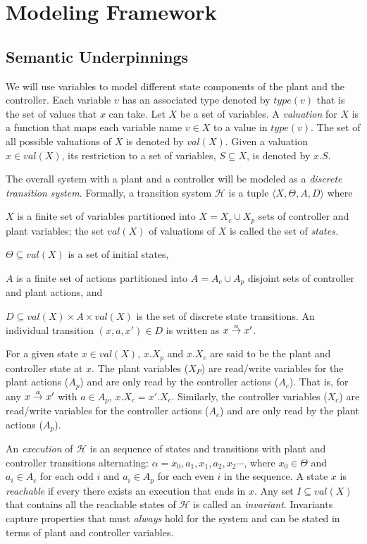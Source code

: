 \newcommand{\dst}{\mathcal{H}}

\section{\mfname Modeling Framework}
\subsection{Semantic Underpinnings}
We will use variables to model different state components of the plant and the controller. Each variable $v$ has an associated type denoted by $type(v)$ that is the set of values that $x$ can take.
Let $X$ be a set of variables. 
%
A {\em valuation\/} for $X$ is a function that maps each variable name $v \in X$ to a value in $type(v)$. The set of all possible valuations of $X$ is denoted by $val(X)$. 
Given a valuation  $x \in val(X)$, its restriction to a set of variables, $S \subseteq X$, is denoted by $x.S$. 

The overall system with a plant and a controller will be modeled as a \emph{discrete transition system\/}.
Formally, a transition system $\dst$  is a tuple $\langle X, \Theta, A, D \rangle$ where 
\begin{enumerate*}[label=(\roman*)]
	\item $X$ is a finite set of variables partitioned into $X= X_c \cup X_p$ sets of controller and plant variables; the set $val(X)$ of valuations of $X$ is called the set of {\em states.} 
    \item $\Theta \subseteq val(X)$ is a set of initial states, 
    \item $A$ is a finite set of actions partitioned into $A = A_c \cup A_p$ disjoint sets of controller and plant actions, and
    \item $D \subseteq val(X) \times A \times val(X)$ is the set of discrete state transitions. An individual transition  $(x, a, x') \in D$ is written as $x \mathrel{\stackrel{a}{\rightarrow}} x'$.
\end{enumerate*}
For a given state $x \in val(X)$, $x.X_p$ and $x.X_c$ are said to be the  plant and controller state at $x$.  
%
The plant variables ($X_P$) are read/write variables for the plant actions ($A_p$) and are only read by the controller actions ($A_c$).
That is, for any $x\mathrel{\stackrel{a}{\rightarrow}}x'$ with $a \in A_p$, $x.X_c = x'.X_c$.  
%
Similarly, the controller variables ($X_c$) are 
read/write variables for the controller actions ($A_c$) and are only read by the plant  actions ($A_p$).

An \emph{execution} of  $\dst$ is an sequence of states and transitions with plant and controller transitions alternating: $\alpha = x_0, a_1, x_1, a_2, x_2 \cdots$, where $x_0 \in \Theta$ and  $a_i \in A_c$  for  each odd $i$ and $a_i \in A_p$ for each even $i$ in the sequence.
A state $x$ is {\em reachable} if every there exists an execution that ends in $x$. 
Any set $I \subseteq val(X)$ that contains all the reachable states of $\dst$ is called an {\em invariant\/}. 
Invariants capture properties that must {\em always} hold for the system and can be stated in terms of plant and controller variables. 


